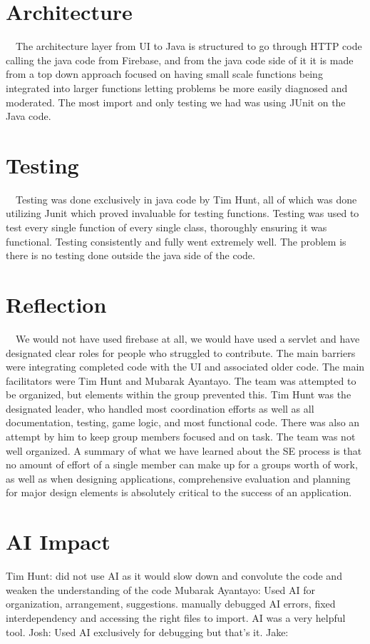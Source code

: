 \documentclass[12pt]{article}
\begin{document}
\section{Architecture}
\ \ The architecture layer from UI to Java is structured to go through HTTP code calling the java code from Firebase, and from the java code side of it it is made from a top down approach focused on having small scale functions being integrated into larger functions letting problems be more easily diagnosed and moderated. The most import and only testing we had was using JUnit on the Java code.
\section{Testing}
\ \ Testing was done exclusively in java code by Tim Hunt, all of which was done utilizing Junit which proved invaluable for testing functions. Testing was used to test every single function of every single class, thoroughly ensuring it was functional. Testing consistently and fully went extremely well. The problem is there is no testing done outside the java side of the code.
\section{Reflection}
\ \ We would not have used firebase at all, we would have used a servlet and have designated clear roles for people who struggled to contribute. The main barriers were integrating completed code with the UI and associated older code. The main facilitators were Tim Hunt and Mubarak Ayantayo. The team was attempted to be organized, but elements within the group prevented this. Tim Hunt was the designated leader, who handled most coordination efforts as well as all documentation, testing, game logic, and most functional code. There was also an attempt by him to keep group members focused and on task. The team was not well organized. A summary of what we have learned about the SE process is that no amount of effort of a single member can make up for a groups worth of work, as well as when designing applications, comprehensive evaluation and planning for major design elements is absolutely critical to the success of an application.

\section{AI Impact}
Tim Hunt: did not use AI as it would slow down and convolute the code and weaken the understanding of the code \newline
Mubarak Ayantayo: Used AI for organization, arrangement, suggestions. manually debugged AI errors, fixed interdependency and accessing the right files to import. AI was a very helpful tool.   \newline
Josh: Used AI exclusively for debugging but that's it. \newline
Jake:
\end{document}
